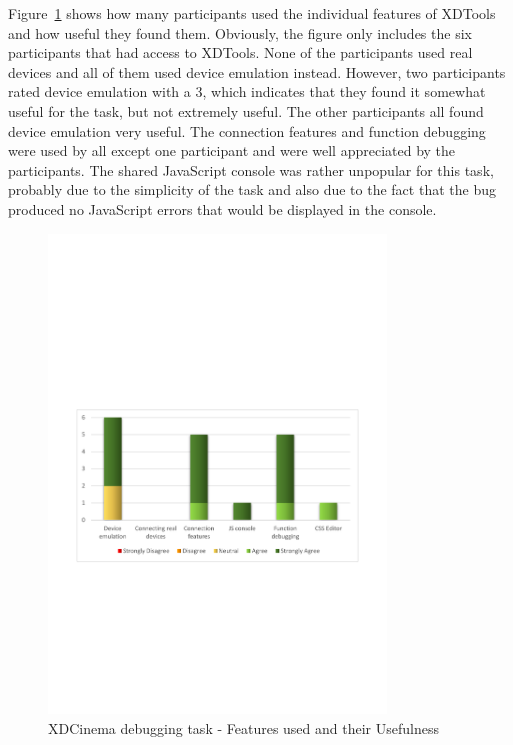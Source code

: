 Figure~\ref{fig:xdc_bug_features_used} shows how many participants used the individual features of XDTools and how useful they found them. Obviously, the figure only includes the six participants that had access to XDTools. None of the participants used real devices and all of them used device emulation instead. However, two participants rated device emulation with a 3, which indicates that they found it somewhat useful for the task, but not extremely useful. The other participants all found device emulation very useful. The connection features and function debugging were used by all except one participant and were well appreciated by the participants. The shared JavaScript console was rather unpopular for this task, probably due to the simplicity of the task and also due to the fact that the bug produced no JavaScript errors that would be displayed in the console.

\begin{figure}[H]
  \centering
    \includegraphics[width=0.8\textwidth]{images/charts/xdc_bug_features_used.pdf}
	\caption[xdc-bug: Features used]{XDCinema debugging task - Features used and their Usefulness}
	\label{fig:xdc_bug_features_used}
\end{figure}

